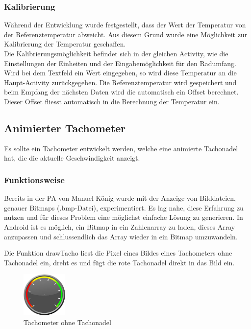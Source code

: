\subsubsection{Kalibrierung}

Während der Entwicklung wurde festgestellt, dass der Wert der Temperatur von der Referenztemperatur abweicht. Aus diesem Grund wurde eine Möglichkeit zur Kalibrierung der Temperatur geschaffen.\\

Die Kalibrierungsmöglichkeit befindet sich in der gleichen Activity, wie die Einstellungen der Einheiten und der Eingabemöglichkeit für den Radumfang. Wird bei dem Textfeld ein Wert eingegeben, so wird diese Temperatur an die Haupt-Activity zurückgegeben. Die Referenztemperatur wird gespeichert und beim Empfang der nächsten Daten wird die automatisch ein Offset berechnet. Dieser Offset fliesst automatisch in die Berechnung der Temperatur ein.

\subsection{Animierter Tachometer}

Es sollte ein Tachometer entwickelt werden, welche eine animierte Tachonadel hat, die die aktuelle Geschwindigkeit anzeigt.

\subsubsection{Funktionsweise}

Bereits in der PA von Manuel König \cite{PA_koenigma} wurde mit der Anzeige von Bilddateien, genauer Bitmaps (.bmp-Datei), experimentiert. Es lag nahe, diese Erfahrung zu nutzen und für dieses Problem eine möglichst einfache Lösung zu generieren. In Android ist es möglich, ein Bitmap in ein Zahlenarray zu laden, dieses Array anzupassen und schlussendlich das Array wieder in ein Bitmap umzuwandeln.

Die Funktion drawTacho liest die Pixel eines Bildes eines Tachometers ohne Tachonadel ein, dreht es und fügt die rote Tachonadel direkt in das Bild ein.

\begin{figure}[ht]
    \includegraphics[width=0.2\textwidth]{3Vorgehen/imag/tachometer.png}
    \caption{Tachometer ohne Tachonadel}
	\label{tachometer} 
\end{figure}

